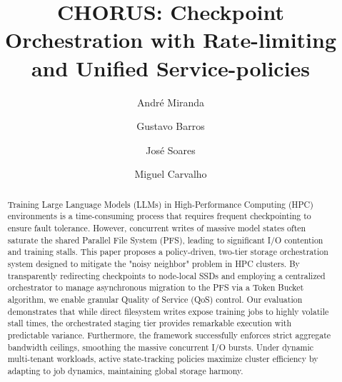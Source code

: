 \documentclass[sigplan,twocolumn,10pt,nonacm]{acmart}
\begin{document}
\title[Advanced Computing Project (2025/26)]{CHORUS: Checkpoint Orchestration with Rate-limiting and Unified Service-policies}

\author{André Miranda}

\author{Gustavo Barros}

\author{José Soares}

\author{Miguel Carvalho}

\renewcommand{\shortauthors}{Miranda et al.}

\begin{abstract}
    Training Large Language Models (LLMs) in High-Performance Computing (HPC) environments is a time-consuming process that requires frequent
    checkpointing to ensure fault tolerance. However, concurrent writes of massive model states often saturate the shared Parallel File System
    (PFS), leading to significant I/O contention and training stalls. This paper proposes a policy-driven, two-tier storage orchestration system
    designed to mitigate the "noisy neighbor" problem in HPC clusters. By transparently redirecting checkpoints to node-local SSDs and employing
    a centralized orchestrator to manage asynchronous migration to the PFS via a Token Bucket algorithm, we enable granular Quality of Service (QoS)
    control. Our evaluation demonstrates that while direct filesystem writes expose training jobs to highly volatile stall times, the orchestrated
    staging tier provides remarkable execution with predictable variance. Furthermore, the framework successfully enforces strict aggregate bandwidth
    ceilings, smoothing the massive concurrent I/O bursts. Under dynamic multi-tenant workloads, active state-tracking policies maximize cluster efficiency
    by adapting to job dynamics, maintaining global storage harmony.
\end{abstract}

\end{document}
